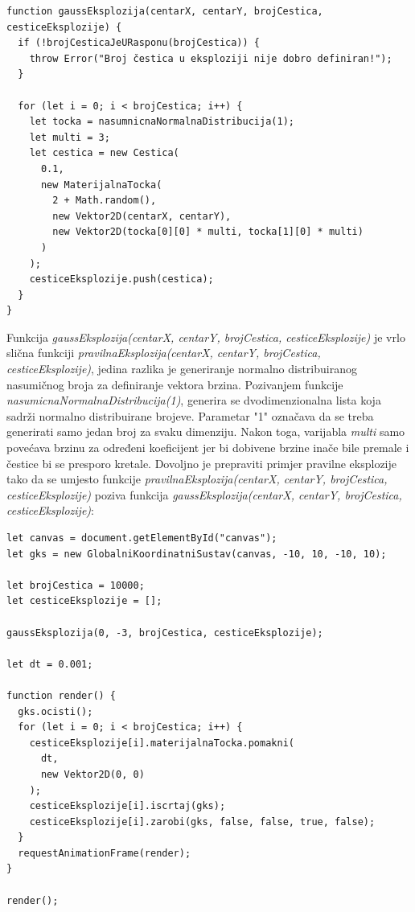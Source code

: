 \documentclass{foi}
\begin{document}
\begin{verbatim}
function gaussEksplozija(centarX, centarY, brojCestica, cesticeEksplozije) {
  if (!brojCesticaJeURasponu(brojCestica)) {
    throw Error("Broj čestica u eksploziji nije dobro definiran!");
  }

  for (let i = 0; i < brojCestica; i++) {
    let tocka = nasumnicnaNormalnaDistribucija(1);
    let multi = 3;
    let cestica = new Cestica(
      0.1,
      new MaterijalnaTocka(
        2 + Math.random(),
        new Vektor2D(centarX, centarY),
        new Vektor2D(tocka[0][0] * multi, tocka[1][0] * multi)
      )
    );
    cesticeEksplozije.push(cestica);
  }
}
\end{verbatim}

Funkcija \textit{gaussEksplozija(centarX, centarY, brojCestica, cesticeEksplozije)} je vrlo slična funkciji \textit{pravilnaEksplozija(centarX, centarY, brojCestica, cesticeEksplozije)}, jedina razlika je generiranje normalno distribuiranog nasumičnog broja za definiranje vektora brzina. Pozivanjem funkcije \textit{nasumicnaNormalnaDistribucija(1)}, generira se dvodimenzionalna lista koja sadrži normalno distribuirane brojeve. Parametar "1" označava da se treba generirati samo jedan broj za svaku dimenziju. Nakon toga, varijabla \textit{multi} samo povećava brzinu za određeni koeficijent jer bi dobivene brzine inače bile premale i čestice bi se presporo kretale. Dovoljno je prepraviti primjer pravilne eksplozije tako da se umjesto funkcije \textit{pravilnaEksplozija(centarX, centarY, brojCestica, cesticeEksplozije)} poziva funkcija \textit{gaussEksplozija(centarX, centarY, brojCestica, cesticeEksplozije)}:

\begin{verbatim}
let canvas = document.getElementById("canvas");
let gks = new GlobalniKoordinatniSustav(canvas, -10, 10, -10, 10);

let brojCestica = 10000;
let cesticeEksplozije = [];

gaussEksplozija(0, -3, brojCestica, cesticeEksplozije);

let dt = 0.001;

function render() {
  gks.ocisti();
  for (let i = 0; i < brojCestica; i++) {
    cesticeEksplozije[i].materijalnaTocka.pomakni(
      dt,
      new Vektor2D(0, 0)
    );
    cesticeEksplozije[i].iscrtaj(gks);
    cesticeEksplozije[i].zarobi(gks, false, false, true, false);
  }
  requestAnimationFrame(render);
}

render();

\end{verbatim}
\end{document}
